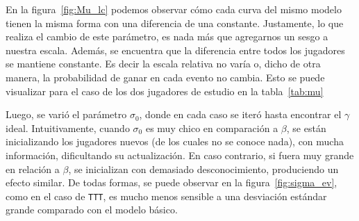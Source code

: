 \documentclass[11pt,twoside,spanish]{report} %
\begin{document}
En la figura~\ref{fig:Mu_lc} podemos observar c\'omo cada curva del mismo modelo tienen la misma forma con una diferencia de una constante.
Justamente, lo que realiza el cambio de este par\'ametro, es nada m\'as que agregarnos un sesgo a nuestra escala.
Adem\'as, se encuentra que la diferencia entre todos los jugadores se mantiene constante.
Es decir la escala relativa no var\'ia o, dicho de otra manera, la probabilidad de ganar en cada evento no cambia.
Esto se puede visualizar para el caso de los dos jugadores de estudio en la tabla~\ref{tab:mu}


\begin{table}[H]
\centering
{}
\caption{Tabla de valores para los par\'ametros del modelo para el caso de tres habilidades iniciales diferentes. En estos casos, $\beta$ es 1, el $\sigma_0$ inicial es 3 y el $\gamma$ $1e-07$.}
\label{tab:mu}
\end{table}


Luego, se vari\'o el par\'ametro $\sigma_0$, donde en cada caso se iter\'o hasta encontrar el $\gamma$ ideal.
Intuitivamente, cuando $\sigma_0$ es muy chico en comparaci\'on a $\beta$, se est\'an inicializando los jugadores nuevos (de los cuales no se conoce nada), con mucha informaci\'on, dificultando su actualizaci\'on.
En caso contrario, si fuera muy grande en relaci\'on a $\beta$, se inicializan con demasiado desconocimiento, produciendo un efecto similar.
De todas formas, se puede observar en la figura~\ref{fig:sigma_ev}, como en el caso de \texttt{TTT}, es mucho menos sensible a una desviaci\'on est\'andar grande comparado con el modelo b\'asico.
\end{document}
